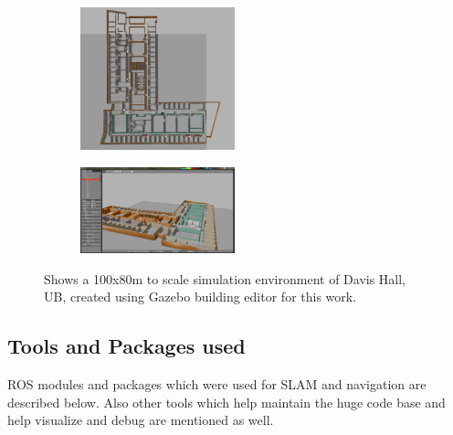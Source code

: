\begin{figure}[!h]
    \begin{subfigure}[b]{\textwidth}
		\centering
		\includegraphics[width=0.49\textwidth]{images/davis3g1.png}
		\label{subfig:a}
		\caption{}
		\vspace{2em}
	\end{subfigure}
	\begin{subfigure}[b]{\textwidth}
	    \centering
		\includegraphics[width=0.49\textwidth]{images/davis3g2.png}
		\label{subfig:b}
		\caption{}
	\end{subfigure}
\caption{Shows a 100x80m to scale simulation environment of Davis Hall, UB, created using Gazebo building editor for this work.}
\end{figure}



\subsection{Tools and Packages used}
ROS modules and packages which were used for SLAM and navigation are described below. Also other tools which help maintain the huge code base and help visualize and debug are mentioned as well. 

